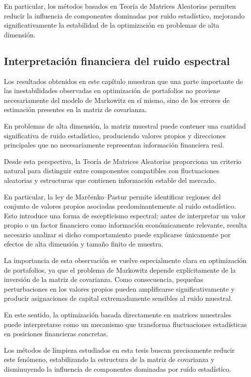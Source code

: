 \documentclass[letterpaper,12pt,oneside]{book}
\begin{document}
En particular, los métodos basados en Teoría de Matrices Aleatorias permiten reducir la influencia de componentes dominadas por ruido estadístico, mejorando significativamente la estabilidad de la optimización en problemas de alta dimensión.

\subsection{Interpretación financiera del ruido espectral}

Los resultados obtenidos en este capítulo muestran que una parte importante de las inestabilidades observadas en optimización de portafolios no proviene necesariamente del modelo de Markowitz en sí mismo, sino de los errores de estimación presentes en la matriz de covarianza.

En problemas de alta dimensión, la matriz muestral puede contener una cantidad significativa de ruido estadístico, produciendo valores propios y direcciones principales que no necesariamente representan información financiera real.

Desde esta perspectiva, la Teoría de Matrices Aleatorias proporciona un criterio natural para distinguir entre componentes compatibles con fluctuaciones aleatorias y estructuras que contienen información estable del mercado.

En particular, la ley de Marčenko--Pastur permite identificar regiones del conjunto de valores propios asociadas predominantemente al ruido estadístico. Esto introduce una forma de escepticismo espectral: antes de interpretar un valor propio o un factor financiero como información económicamente relevante, resulta necesario analizar si dicho comportamiento puede explicarse únicamente por efectos de alta dimensión y tamaño finito de muestra.

La importancia de esta observación se vuelve especialmente clara en optimización de portafolios, ya que el problema de Markowitz depende explícitamente de la inversión de la matriz de covarianza. Como consecuencia, pequeñas perturbaciones en los valores propios pueden amplificarse significativamente y producir asignaciones de capital extremadamente sensibles al ruido muestral.

En este sentido, la optimización basada directamente en matrices muestrales puede interpretarse como un mecanismo que transforma fluctuaciones estadísticas en posiciones financieras concretas.

Los métodos de limpieza estudiados en esta tesis buscan precisamente reducir este fenómeno, estabilizando la estructura de la matriz de covarianza y disminuyendo la influencia de componentes dominadas por ruido estadístico.
\end{document}
